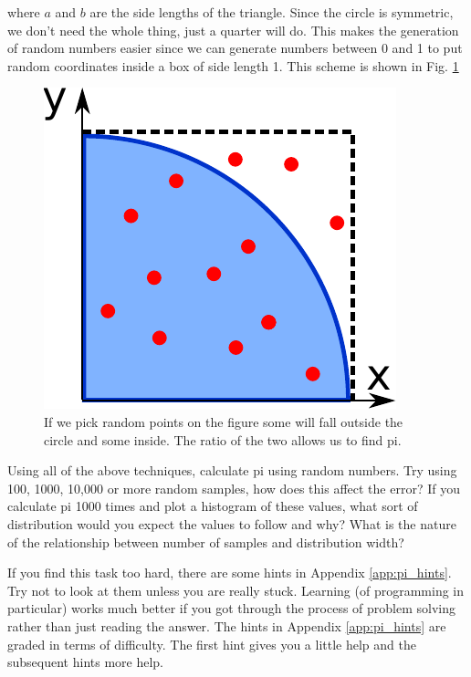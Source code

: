 	where $a$ and $b$ are the side lengths of the triangle. Since the circle is symmetric, we don't need the whole thing, just a quarter will do. This makes the generation of random numbers easier since we can generate numbers between 0 and 1 to put random coordinates inside a box of side length 1. This scheme is shown in Fig. \ref{fig:piarc}

	\begin{figure}[h]
		\centering
		\includegraphics[scale=0.6]{images/piarc}
		\caption{If we pick random points on the figure some will fall outside the circle and some inside. The ratio of the two allows us to find pi.}
		\label{fig:piarc}
	\end{figure}

	\begin{task}Using all of the above techniques, calculate pi using random numbers. Try using 100, 1000, 10,000 or more random samples, how does this affect the error? If you calculate pi 1000 times and plot a histogram of these values, what sort of distribution would you expect the values to follow and why? What is the nature of the relationship between number of samples and distribution width?\end{task}
	If you find this task too hard, there are some hints in Appendix \ref{app:pi_hints}. Try not to look at them unless you are really stuck. Learning (of programming in particular) works much better if you got through the process of problem solving rather than just reading the answer. The hints in Appendix \ref{app:pi_hints} are graded in terms of difficulty. The first hint gives you a little help and the subsequent hints more help.


